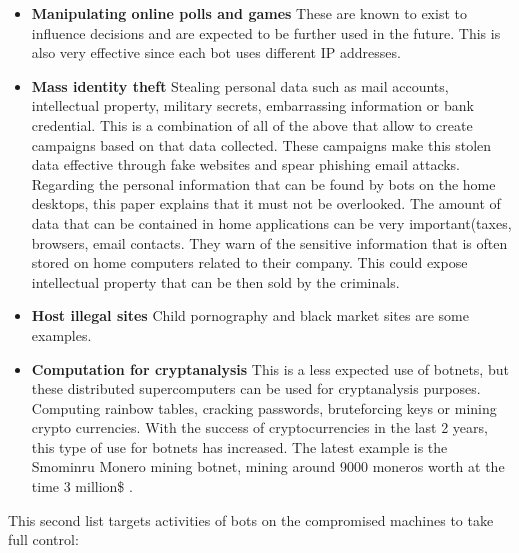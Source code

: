 \begin{itemize}[noitemsep]
\item \textbf{Manipulating online polls and games} These are known to exist to influence decisions and are expected to be further used in the future. This is also very effective since each bot uses different IP addresses.
\item \textbf{Mass identity theft} Stealing personal data such as mail accounts, intellectual property, military secrets, embarrassing information or bank credential. This is a combination of all of the above that allow to create campaigns based on that data collected. These campaigns make this stolen data effective through fake websites and spear phishing email attacks. \cite{tracking}
Regarding the personal information that can be found by bots on the home desktops, this paper explains that it must not be overlooked. The amount of data that can be contained in home applications can be very important(taxes, browsers, email contacts. They warn of the sensitive information that is often stored on home computers related to their company. This could expose intellectual property that can be then sold by the criminals.
\item \textbf{Host illegal sites} Child pornography and black market sites are some examples.
\item \textbf{Computation for cryptanalysis} This is a less expected use of botnets, but these distributed supercomputers can be used for cryptanalysis purposes. Computing rainbow tables, cracking passwords, bruteforcing keys or mining crypto currencies. With the success of cryptocurrencies in the last 2 years, this type of use for botnets has increased. The latest example is the Smominru Monero mining botnet, mining around 9000 moneros worth at the time 3 million\$\cite{monero} \cite{tracking}.
\end{itemize}
This second list targets activities of bots on the compromised machines to take full control\cite{survey6}:
